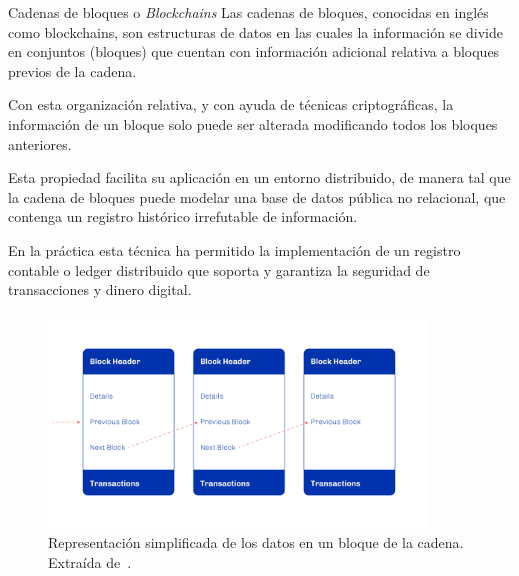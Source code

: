 \documentclass{beamer}
\begin{document}
\begin{frame}{Cadenas de bloques o \textit{Blockchains}}
Las cadenas de bloques, conocidas en inglés como blockchains, son estructuras de datos en las cuales la información se divide en conjuntos (bloques) que cuentan con información adicional relativa a bloques previos de la cadena.
\smallskip

\pause

Con esta organización relativa, y con ayuda de técnicas criptográficas, la información de un bloque solo puede ser alterada modificando todos los bloques anteriores.
\smallskip

\pause

Esta propiedad facilita su aplicación en un entorno distribuido, de manera tal que la cadena de bloques puede modelar una base de datos pública no relacional, que contenga un registro histórico irrefutable de información.
\smallskip

\pause

En la práctica esta técnica ha permitido la implementación de un registro contable o ledger distribuido que soporta y garantiza la seguridad de transacciones y dinero digital. 

\end{frame}


\begin{frame}

\begin{figure}
    \centering
    \includegraphics[width=0.9\textwidth]{Bloques.png}
    \caption[Representación simplificada de los datos en un bloque de la cadena.]{Representación simplificada de los datos en un bloque de la cadena. Extraída de~\cite{plutus-smart-contracts}.}\label{fig:Bloques}
\end{figure}


\end{frame}
\end{document}
